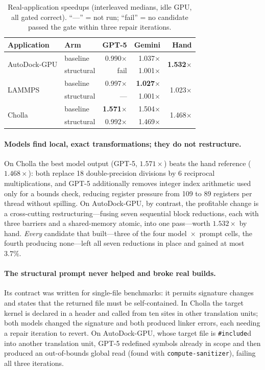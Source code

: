 \begin{table}[t]
\centering
\footnotesize
\caption{Real-application speedups (interleaved medians, idle GPU, all gated correct).
  ``---'' = not run; ``fail'' = no candidate passed the gate within three repair iterations.}
\label{tab:realapps}
\setlength{\tabcolsep}{3pt}
\begin{tabular}{@{}llrrr@{}}
\toprule
\textbf{Application} & \textbf{Arm} & \textbf{GPT-5} & \textbf{Gemini} & \textbf{Hand} \\
\midrule
\multirow{2}{*}{AutoDock-GPU}
  & baseline    & 0.990$\times$ & 1.037$\times$ & \multirow{2}{*}{\textbf{1.532}$\times$} \\
  & structural  & fail          & 1.001$\times$ & \\
\midrule
\multirow{2}{*}{LAMMPS}
  & baseline    & 0.997$\times$ & \textbf{1.027}$\times$ & \multirow{2}{*}{1.023$\times$} \\
  & structural  & ---           & 1.001$\times$ & \\
\midrule
\multirow{2}{*}{Cholla}
  & baseline    & \textbf{1.571}$\times$ & 1.504$\times$ & \multirow{2}{*}{1.468$\times$} \\
  & structural  & 0.992$\times$ & 1.469$\times$ & \\
\bottomrule
\end{tabular}
\end{table}

\paragraph{Models find local, exact transformations; they do not restructure.}
On Cholla the best model output (GPT-5, $1.571\times$) beats the hand reference ($1.468\times$): both
replace 18 double-precision divisions by 6 reciprocal multiplications, and GPT-5 additionally removes
integer index arithmetic used only for a bounds check, reducing register pressure from 109 to 89
registers per thread without spilling. On AutoDock-GPU, by contrast, the profitable change is a
cross-cutting restructuring---fusing seven sequential block reductions, each with three barriers and a
shared-memory atomic, into one pass---worth $1.532\times$ by hand. \emph{Every} candidate that built---three
of the four model~$\times$~prompt cells, the fourth producing none---left all seven reductions in place
and gained at most $3.7\%$.

\paragraph{The structural prompt never helped and broke real builds.}
Its contract was written for single-file benchmarks: it permits signature changes and states that the
returned file must be self-contained. In Cholla the target kernel is declared in a header and called
from ten sites in other translation units; both models changed the signature and both produced linker
errors, each needing a repair iteration to revert. On AutoDock-GPU, whose target file is
\texttt{\#include}d into another translation unit, GPT-5 redefined symbols already in scope and then
produced an out-of-bounds global read (found with \texttt{compute-sanitizer}), failing all three
iterations.

